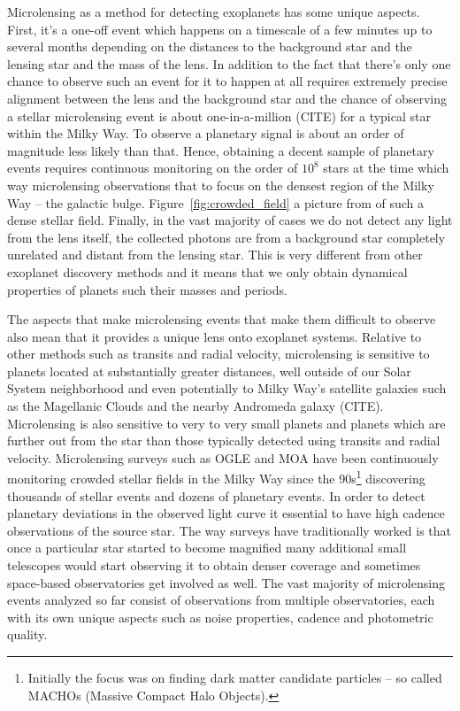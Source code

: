 \documentclass[11pt]{report}
\begin{document}
Microlensing as a method for detecting exoplanets has some unique aspects.
First, it's a one-off event which happens on a timescale of a few minutes up to
several months depending on the distances to the background star and the
lensing star and the mass of the lens. In addition to the fact that there's
only one chance to observe such an event for it to happen at all requires
extremely precise alignment between the lens and the background star and the
chance of observing a stellar microlensing event is about one-in-a-million
(CITE) for a typical star within the Milky Way. To observe a planetary signal
is about an order of magnitude less likely than that. Hence, obtaining a decent
sample of planetary events requires continuous monitoring on the order of
$10^{8}$ stars at the time which way microlensing observations that to focus on
the densest region of the Milky Way -- the galactic bulge.
Figure~\ref{fig:crowded_field} a picture from of such a dense stellar field.
Finally, in the vast majority of cases we do not detect any light from the lens
itself, the collected photons are from a background star completely unrelated
and distant from the lensing star. This is very different from other exoplanet
discovery methods and it means that we only obtain dynamical properties of
planets such their masses and periods.

The aspects that make microlensing events that make them difficult to observe
also mean that it provides a unique lens onto exoplanet systems. Relative to
other methods such as transits and radial velocity, microlensing is sensitive
to planets located at substantially greater distances, well outside of our
Solar System neighborhood and even potentially to Milky Way's satellite
galaxies such as the Magellanic Clouds and the nearby Andromeda galaxy (CITE).
Microlensing is also sensitive to very to very small planets and planets which
are further out from the star than those typically detected using transits and
radial velocity. Microlensing surveys such as OGLE \citep{1993AcA....43..289U}
and MOA \citep{1999PThPS.133..233M} have been continuously monitoring crowded
stellar fields in the Milky Way since the 90s\footnote{Initially the focus was
    on finding dark matter candidate particles -- so called MACHOs (Massive Compact
    Halo Objects).} discovering thousands of stellar events and dozens of planetary
events. In order to detect planetary deviations in the observed light curve it
essential to have high cadence observations of the source star. The way surveys
have traditionally worked is that once a particular star started to become
magnified many additional small telescopes would start observing it to obtain
denser coverage and sometimes space-based observatories get involved as well.
The vast majority of microlensing events analyzed so far consist of
observations from multiple observatories, each with its own unique aspects such
as noise properties, cadence and photometric quality.
\end{document}
